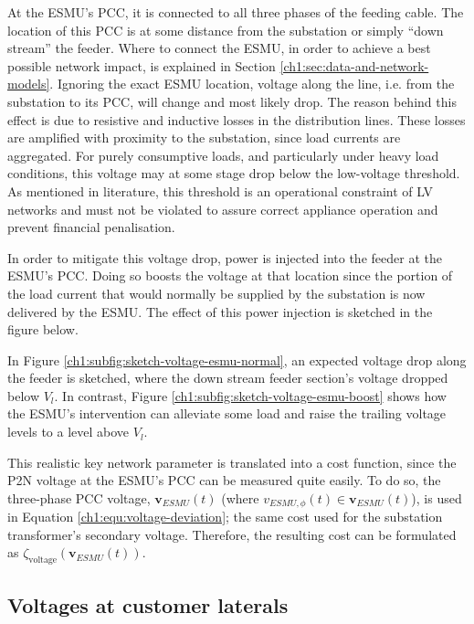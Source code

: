 At the ESMU's PCC, it is connected to all three phases of the feeding cable.
The location of this PCC is at some distance from the substation or simply ``down stream'' the feeder.
Where to connect the ESMU, in order to achieve a best possible network impact, is explained in Section \ref{ch1:sec:data-and-network-models}.
Ignoring the exact ESMU location, voltage along the line, i.e. from the substation to its PCC, will change and most likely drop.
The reason behind this effect is due to resistive and inductive losses in the distribution lines.
These losses are amplified with proximity to the substation, since load currents are aggregated.
For purely consumptive loads, and particularly under heavy load conditions, this voltage may at some stage drop below the low-voltage threshold.
As mentioned in literature, this threshold is an operational constraint of LV networks and must not be violated to assure correct appliance operation and prevent financial penalisation.

In order to mitigate this voltage drop, power is injected into the feeder at the ESMU's PCC.
Doing so boosts the voltage at that location since the portion of the load current that would normally be supplied by the substation is now delivered by the ESMU.
The effect of this power injection is sketched in the figure below.



In Figure \ref{ch1:subfig:sketch-voltage-esmu-normal}, an expected voltage drop along the feeder is sketched, where the down stream feeder section's voltage dropped below $V_l$.
In contrast, Figure \ref{ch1:subfig:sketch-voltage-esmu-boost} shows how the ESMU's intervention can alleviate some load and raise the trailing voltage levels to a level above $V_l$.

This realistic key network parameter is translated into a cost function, since the P2N voltage at the ESMU's PCC can be measured quite easily.
To do so, the three-phase PCC voltage, $\textbf{v}_{ESMU}(t)$ (where $v_{ESMU,\phi}(t) \in \textbf{v}_{ESMU}(t)$), is used in Equation \ref{ch1:equ:voltage-deviation}; the same cost used for the substation transformer's secondary voltage.
Therefore, the resulting cost can be formulated as $\zeta_\text{voltage}(\textbf{v}_{ESMU}(t))$.

\subsection{Voltages at customer laterals}
\label{ch1:subsec:voltages-at-customers}

